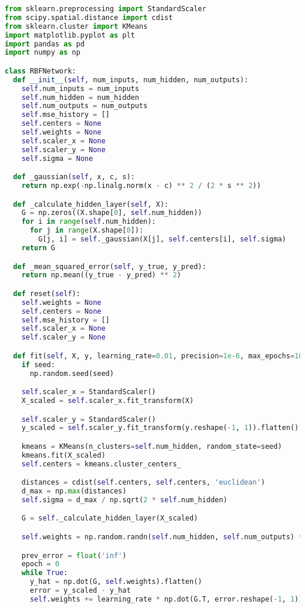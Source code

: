 \vspace{8pt}
\begin{lstlisting}[language=Python, caption={Classe RBFNetwork}]
from sklearn.preprocessing import StandardScaler
from scipy.spatial.distance import cdist
from sklearn.cluster import KMeans
import matplotlib.pyplot as plt
import pandas as pd
import numpy as np

class RBFNetwork:
  def __init__(self, num_inputs, num_hidden, num_outputs):
    self.num_inputs = num_inputs
    self.num_hidden = num_hidden
    self.num_outputs = num_outputs
    self.mse_history = []
    self.centers = None
    self.weights = None
    self.scaler_x = None
    self.scaler_y = None
    self.sigma = None

  def _gaussian(self, x, c, s):
    return np.exp(-np.linalg.norm(x - c) ** 2 / (2 * s ** 2))

  def _calculate_hidden_layer(self, X):
    G = np.zeros((X.shape[0], self.num_hidden))
    for i in range(self.num_hidden):
      for j in range(X.shape[0]):
        G[j, i] = self._gaussian(X[j], self.centers[i], self.sigma)
    return G

  def _mean_squared_error(self, y_true, y_pred):
    return np.mean((y_true - y_pred) ** 2)

  def reset(self):
    self.weights = None
    self.centers = None
    self.mse_history = []
    self.scaler_x = None
    self.scaler_y = None

  def fit(self, X, y, learning_rate=0.01, precision=1e-6, max_epochs=1000, seed=None):
    if seed:
      np.random.seed(seed)

    self.scaler_x = StandardScaler()
    X_scaled = self.scaler_x.fit_transform(X)

    self.scaler_y = StandardScaler()
    y_scaled = self.scaler_y.fit_transform(y.reshape(-1, 1)).flatten()

    kmeans = KMeans(n_clusters=self.num_hidden, random_state=seed)
    kmeans.fit(X_scaled)
    self.centers = kmeans.cluster_centers_

    distances = cdist(self.centers, self.centers, 'euclidean')
    d_max = np.max(distances)
    self.sigma = d_max / np.sqrt(2 * self.num_hidden)

    G = self._calculate_hidden_layer(X_scaled)

    self.weights = np.random.randn(self.num_hidden, self.num_outputs) * 0.1

    prev_error = float('inf')
    epoch = 0
    while True:
      y_hat = np.dot(G, self.weights).flatten()
      error = y_scaled - y_hat
      self.weights += learning_rate * np.dot(G.T, error.reshape(-1, 1))


\end{lstlisting}
